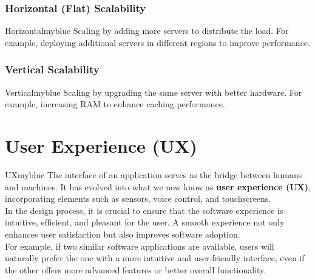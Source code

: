 \subsubsection{Horizontal (Flat) Scalability}  
\begin{prettyBox}{Horizontal}{myblue}  
Scaling by adding more servers to distribute the load.  
For example, deploying additional servers in different regions to improve performance.  
\end{prettyBox}  

\vspace{0.25cm}  

\subsubsection{Vertical Scalability}  
\begin{prettyBox}{Vertical}{myblue}  
Scaling by upgrading the same server with better hardware.  
For example, increasing RAM to enhance caching performance.  
\end{prettyBox}  

\newpage

\section{User Experience (UX)}
\begin{prettyBox}{UX}{myblue}
The interface of an application serves as the bridge between humans and machines.  
It has evolved into what we now know as \textbf{user experience (UX)}, incorporating elements such as sensors, voice control, and touchscreens.\\[0.15cm]
In the design process, it is crucial to ensure that the software experience is intuitive, efficient, and pleasant for the user.  
A smooth experience not only enhances user satisfaction but also improves software adoption.\\[0.15cm]
For example, if two similar software applications are available, users will 
naturally prefer the one with a more intuitive and user-friendly interface, 
even if the other offers more advanced features or better overall functionality.
\end{prettyBox}
\vspace{1cm}


